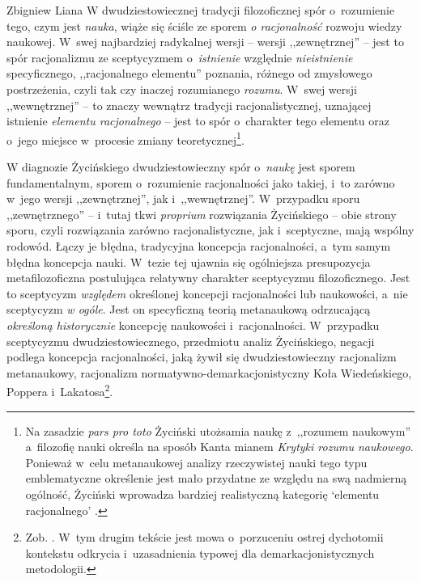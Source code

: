 \begin{artplenv}{Zbigniew Liana}
W dwudziestowiecznej tradycji filozoficznej spór o~rozumienie tego, czym jest \textit{nauka}, wiąże się ściśle ze
sporem \textit{o racjonalność }rozwoju wiedzy naukowej. W~swej najbardziej radykalnej wersji -- wersji ,,zewnętrznej'' --
jest to spór racjonalizmu ze sceptycyzmem o~\textit{istnienie} względnie \textit{nieistnienie} specyficznego, ,,racjonalnego
elementu'' poznania, różnego od zmysłowego postrzeżenia, czyli tak czy inaczej rozumianego \textit{rozumu}. W~swej wersji
,,wewnętrznej'' -- to znaczy wewnątrz tradycji racjonalistycznej, uznającej istnienie \textit{elementu racjonalnego} -- jest
to spór o~charakter tego elementu oraz o~jego miejsce w~procesie zmiany teoretycznej\footnote{Na zasadzie \textit{pars
pro toto} Życiński
\parencite*[s.~184]{zycinski_jezyk_1983}
utożsamia naukę z~,,rozumem naukowym'' a~filozofię nauki
określa na sposób Kanta mianem \textit{Krytyki rozumu naukowego}. Ponieważ w~celu metanaukowej analizy rzeczywistej nauki
tego typu emblematyczne określenie jest mało przydatne ze względu na swą nadmierną ogólność, Życiński wprowadza
bardziej realistyczną kategorię `elementu racjonalnego'
\parencite[s.~142n]{zycinski_jezyk_1983}.
}.

W diagnozie Życińskiego dwudziestowieczny spór o~\textit{naukę} jest sporem fundamentalnym, sporem o~rozumienie
racjonalności jako takiej, i~to zarówno w~jego wersji ,,zewnętrznej'', jak i~,,wewnętrznej''. W~przypadku sporu
,,zewnętrznego'' -- i~tutaj tkwi \textit{proprium} rozwiązania Życińskiego -- obie strony sporu, czyli rozwiązania zarówno
racjonalistyczne, jak i~sceptyczne, mają wspólny rodowód. Łączy je błędna, tradycyjna koncepcja racjonalności, a~tym
samym błędna koncepcja nauki. W~tezie tej ujawnia się ogólniejsza presupozycja metafilozoficzna postulująca relatywny
charakter sceptycyzmu filozoficznego. Jest to sceptycyzm \textit{względem} określonej koncepcji racjonalności lub
naukowości, a~nie sceptycyzm \textit{w ogóle}. Jest on specyficzną teorią metanaukową odrzucającą \textit{określoną
historycznie} koncepcję naukowości i~racjonalności. W~przypadku sceptycyzmu dwudziestowiecznego, przedmiotu analiz
Życińskiego, negacji podlega koncepcja racjonalności, jaką żywił się dwudziestowieczny racjonalizm metanaukowy,
racjonalizm normatywno-demarkacjonistyczny Koła Wiedeńskiego, Poppera i~Lakatosa\footnote{Zob.
\parencites[s.~228]{zycinski_elementy_1996}[s.~186]{zycinski_jezyk_1983}.
W~tym drugim tekście jest mowa o~porzuceniu ostrej
dychotomii kontekstu odkrycia i~uzasadnienia typowej dla demarkacjonistycznych metodologii.}.


\end{artplenv}
